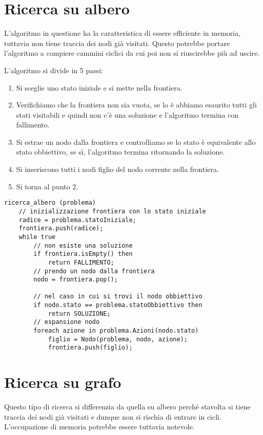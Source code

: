 \section{Ricerca su albero}
L'algoritmo in questione ha la caratteristica di essere efficiente in memoria, tuttavia
non tiene traccia dei nodi gi\`a visitati. Questo potrebbe portare l'algoritmo a compiere
cammini ciclici da cui poi non si riuscirebbe pi\`u ad uscire.

L'algoritmo si divide in 5 passi:
\begin{enumerate}
	\item Si sceglie uno stato iniziale e si mette nella frontiera.
	\item Verifichiamo che la frontiera non sia vuota, se lo \`e abbiamo esaurito tutti gli
	      stati visitabili e quindi non c'\`e una soluzione e l'algoritmo termina con
	      fallimento.
	\item Si estrae un nodo dalla frontiera e controlliamo se lo stato \`e equivalente allo
	      stato obbiettivo, se s\`i, l'algoritmo termina ritornando la soluzione.
	\item Si inseriscono tutti i nodi figlio del nodo corrente nella frontiera.
	\item Si torna al punto 2.
\end{enumerate}
\begin{lstlisting}[style=pseudo-style]
ricerca_albero (problema)
	// inizializzazione frontiera con lo stato iniziale
	radice = problema.statoIniziale;
	frontiera.push(radice);
	while true
		// non esiste una soluzione
		if frontiera.isEmpty() then
			return FALLIMENTO;
		// prendo un nodo dalla frontiera
		nodo = frontiera.pop();
		
		// nel caso in cui si trovi il nodo obbiettivo
		if nodo.stato == problema.statoObbiettivo then
			return SOLUZIONE;
		// espansione nodo
		foreach azione in problema.Azioni(nodo.stato)
			figlio = Nodo(problema, nodo, azione);
			frontiera.push(figlio);
\end{lstlisting}

\section{Ricerca su grafo}
Questo tipo di ricerca si differenzia da quella su albero perch\'e stavolta si tiene traccia
dei nodi gi\`a visitati e dunque non si rischia di entrare in cicli. L'occupazione di memoria
potrebbe essere tuttavia notevole.

